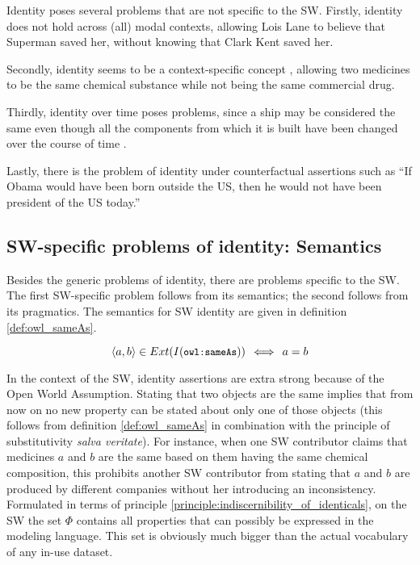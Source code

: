 Identity poses several problems that are not specific to the SW.
Firstly, identity does not hold across (all) modal contexts,
  allowing Lois Lane to believe that Superman saved her,
  without knowing that Clark Kent saved her.

Secondly, identity seems to be a context-specific concept \cite{Geach1967},
  allowing two medicines to be the same chemical substance
  while not being the same commercial drug.

Thirdly, identity over time poses problems,
  since a ship may be considered the same
  even though all the components from which it is built
  have been changed over the course of time \cite{Lewis1986}.

Lastly, there is the problem of identity under counterfactual assertions
  such as ``If Obama would have been born outside the US,
  then he would not have been president of the US today.''\cite{Kripke1980}

\subsection{SW-specific problems of identity: Semantics}

Besides the generic problems of identity,
  there are problems specific to the SW.
The first SW-specific problem follows from its semantics;
  the second follows from its pragmatics.
The semantics for SW identity are given in definition \ref{def:owl_sameAs}.

\begin{definition}
\label{def:owl_sameAs}
\begin{equation}
    \langle a, b \rangle \in Ext(I({\small \texttt{owl:sameAs}}))
  \,\iff\,
    a = b\nonumber
\end{equation}
\end{definition}

\noindent In the context of the SW,
  identity assertions are extra strong because of the Open World Assumption.
Stating that two objects are the same
  implies that from now on no new property can be stated about
  only one of those objects
  (this follows from definition \ref{def:owl_sameAs} in combination with
  the principle of substitutivity \emph{salva veritate}).
For instance, when one SW contributor claims that
  medicines $a$ and $b$ are the same
  based on them having the same chemical composition,
  this prohibits another SW contributor from stating that
  $a$ and $b$ are produced by different companies
  without her introducing an inconsistency.
Formulated in terms of
  principle \ref{principle:indiscernibility_of_identicals},
  on the SW the set $\Phi$ contains
  all properties that can possibly be expressed
  in the modeling language.
This set is obviously much bigger than the actual vocabulary
  of any in-use dataset.

